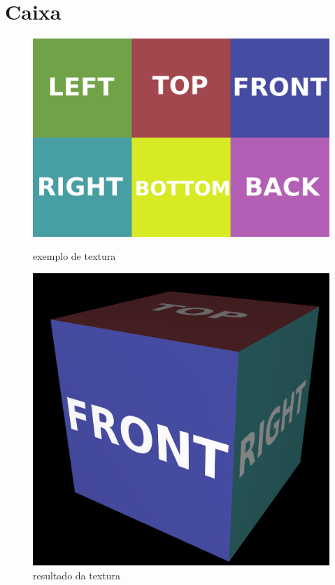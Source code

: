 \documentclass[a4paper]{report}
\begin{document}
\section{Caixa}
\begin{figure}[H]
    \centering
    \begin{minipage}{0.39\textwidth}
        \centering
        \includegraphics[width=\textwidth]{images/test_cube.jpg}
        \caption{exemplo de textura}
    \end{minipage}\hfill
    \begin{minipage}{0.59\textwidth}
        \centering
        \includegraphics[width=\textwidth]{images/test_cube_rendered.png}
        \caption{resultado da textura}
    \end{minipage}\hfill
\end{figure}
\end{document}
